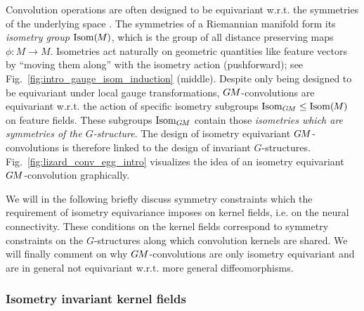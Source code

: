 Convolution operations are often designed to be equivariant w.r.t. the symmetries of the underlying space \cite{Cohen2016-GCNN,Kondor2018-GENERAL}.
The symmetries of a Riemannian manifold form its \emph{isometry group} $\operatorname{Isom}(\mkern-1.5mu M \mkern-.5mu)$, which is the group of all distance preserving maps~${\phi:M\to M}$.
Isometries act naturally on geometric quantities like feature vectors by ``moving them along'' with the isometry action (pushforward); see Fig.~\ref{fig:intro_gauge_isom_induction} (middle).
Despite only being designed to be equivariant under local gauge transformations,
$G\mkern-1.4muM$-convolutions are equivariant w.r.t. the action of specific isometry subgroups $\operatorname{Isom}_{G\mkern-1.4muM} \leq \operatorname{Isom}(\mkern-1.5mu M \mkern-.5mu)$ on feature fields.
These subgroups $\operatorname{Isom}_{G\mkern-1.4muM}$ contain those \emph{isometries which are symmetries of the $G$-structure}.
The design of isometry equivariant $G\mkern-1.4muM$-convolutions is therefore linked to the design of invariant $G$-structures.
Fig.~\ref{fig:lizard_conv_egg_intro} visualizes the idea of an isometry equivariant $G\mkern-1.4muM$-convolution graphically.


We will in the following briefly discuss symmetry constraints which the requirement of isometry equivariance imposes on kernel fields, i.e. on the neural connectivity.
These conditions on the kernel fields correspond to symmetry constraints on the $G$-structures along which convolution kernels are shared.
We will finally comment on why $G\mkern-1.4muM$-convolutions are only isometry equivariant and are in general not equivariant w.r.t. more general diffeomorphisms.






\pagebreak






\subsubsection{Isometry invariant kernel fields}
\label{sec:visual_intro_inv_kernel_fields}

